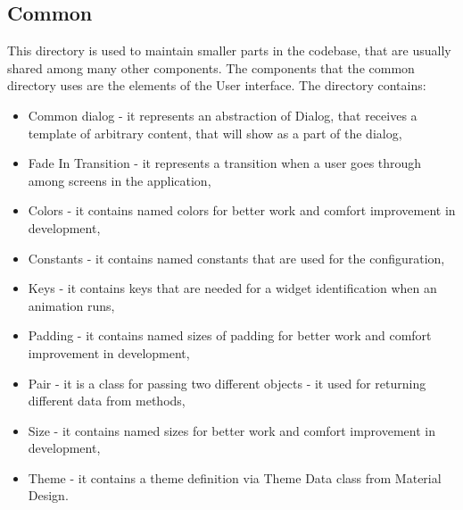 \subsection{Common}\label{subsec:common}
This directory is used to maintain smaller parts in the codebase, that are usually shared among many other components.
The components that the common directory uses are the elements of the User interface.
The directory contains:
\begin{itemize}
    \item Common dialog - it represents an abstraction of Dialog, that receives a template of arbitrary content, that will show as a part of the dialog,
    \item Fade In Transition - it represents a transition when a user goes through among screens in the application,
    \item Colors - it contains named colors for better work and comfort improvement in development,
    \item Constants - it contains named constants that are used for the configuration,
    \item Keys - it contains keys that are needed for a widget identification when an animation runs,
    \item Padding - it contains named sizes of padding for better work and comfort improvement in development,
    \item Pair - it is a class for passing two different objects - it used for returning different data from methods,
    \item Size - it contains named sizes for better work and comfort improvement in development,
    \item Theme - it contains a theme definition via Theme Data class from Material Design.
\end{itemize}
